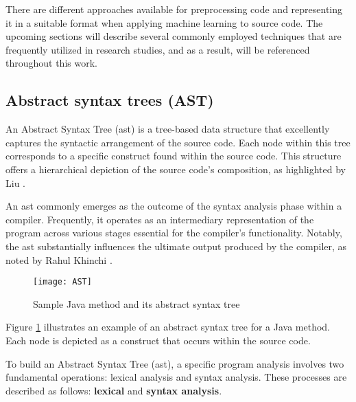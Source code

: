 There are different approaches available for preprocessing code and representing it in a suitable format when applying machine learning to source code. The upcoming sections will describe several commonly employed techniques that are frequently utilized in research studies, and as a result, will be referenced throughout this work.




\subsection{Abstract syntax trees (AST)} %
\label{sec: Abstract_syntax_trees}

An Abstract Syntax Tree (\gls{ast}) is a tree-based data structure that excellently captures the syntactic arrangement of the source code. Each node within this tree corresponds to a specific construct found within the source code. This structure offers a hierarchical depiction of the source code's composition, as highlighted by Liu \cite{Kui_Liu2018}.

An \gls{ast} commonly emerges as the outcome of the syntax analysis phase within a compiler. Frequently, it operates as an intermediary representation of the program across various stages essential for the compiler's functionality. Notably, the \gls{ast} substantially influences the ultimate output produced by the compiler, as noted by Rahul Khinchi \cite{rahulkhinchi7}.\\ 

\begin{figure}[ht]
	\centering
	\texttt{[image: AST]}
	  \caption{Sample Java method and its abstract syntax tree}
  \label{fig:java_ast}
\end{figure}


Figure \ref{fig:java_ast} illustrates an example of an abstract syntax tree for a Java method. Each node is depicted as a construct that occurs within the source code.    


To build an Abstract Syntax Tree (\gls{ast}), a specific program analysis involves two fundamental operations: lexical analysis and syntax analysis. These processes are described as follows: \textbf{lexical} and \textbf{syntax analysis}.

